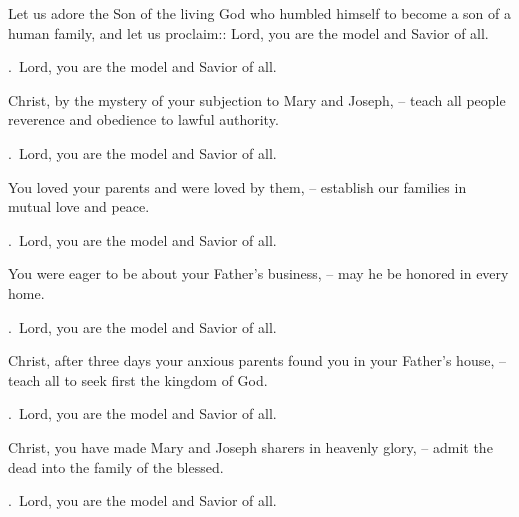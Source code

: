 \lettrine[loversize=0.15,lines=2]{L}{}et us adore the Son of the living God who humbled himself to become a son of a human family, and let us proclaim::
Lord, you are the model and Savior of all.
\par \Rbar.~Lord, you are the model and Savior of all.

Christ, by the mystery of your subjection to Mary and Joseph,
– teach all people reverence and obedience to lawful authority.
\par \Rbar.~Lord, you are the model and Savior of all.

You loved your parents and were loved by them,
– establish our families in mutual love and peace.
\par \Rbar.~Lord, you are the model and Savior of all.

You were eager to be about your Father’s business,
– may he be honored in every home.
\par \Rbar.~Lord, you are the model and Savior of all.

Christ, after three days your anxious parents found you in your Father’s house,
– teach all to seek first the kingdom of God.
\par \Rbar.~Lord, you are the model and Savior of all.

Christ, you have made Mary and Joseph sharers in heavenly glory,
– admit the dead into the family of the blessed.
\par \Rbar.~Lord, you are the model and Savior of all.
